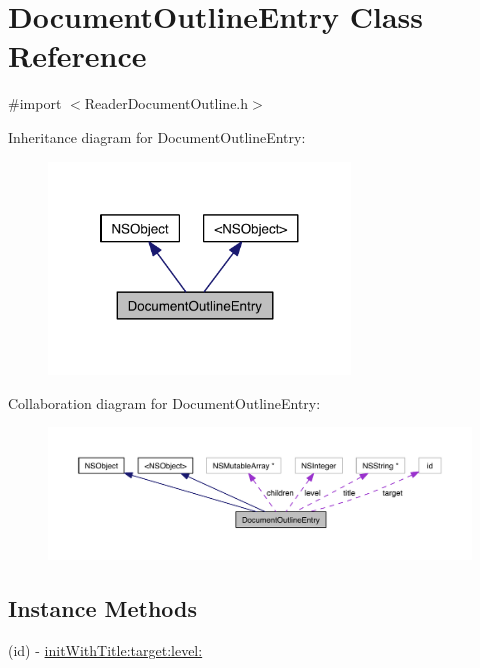 \hypertarget{interface_document_outline_entry}{\section{Document\-Outline\-Entry Class Reference}
\label{de/da0/interface_document_outline_entry}
}


{\ttfamily \#import $<$Reader\-Document\-Outline.\-h$>$}



Inheritance diagram for Document\-Outline\-Entry\-:
\nopagebreak
\begin{figure}[H]
\begin{center}
\leavevmode
\includegraphics[width=227pt]{d8/d72/interface_document_outline_entry__inherit__graph}
\end{center}
\end{figure}


Collaboration diagram for Document\-Outline\-Entry\-:
\nopagebreak
\begin{figure}[H]
\begin{center}
\leavevmode
\includegraphics[width=350pt]{d6/d6a/interface_document_outline_entry__coll__graph}
\end{center}
\end{figure}
\subsection*{Instance Methods}
\begin{DoxyCompactItemize}
\item 
(id) -\/ \hyperlink{interface_document_outline_entry_abb79e8b34d4d229cce77fccce8cc15dc}{init\-With\-Title\-:target\-:level\-:}
\end{DoxyCompactItemize}
